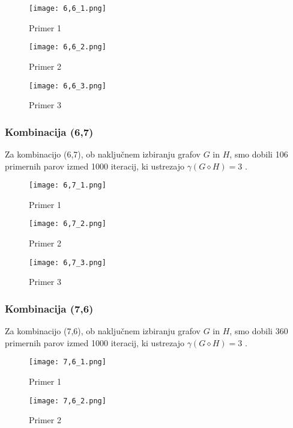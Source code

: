 \documentclass[a4paper,12pt]{article}
\theoremstyle{definition}
\begin{document}
\begin{figure}[H]
\centering
\texttt{[image: 6,6\_1.png]}
\caption{Primer 1}
\end{figure}

\begin{figure}[H]
\centering
\texttt{[image: 6,6\_2.png]}
\caption{Primer 2}
\end{figure}

\begin{figure}[H]
\centering
\texttt{[image: 6,6\_3.png]}
\caption{Primer 3}
\end{figure}

\subsubsection{Kombinacija (6,7)}
\noindent Za kombinacijo (6,7), ob naključnem izbiranju grafov $G$ in $H$, smo dobili 106 primernih parov izmed 1000 iteracij, ki ustrezajo $\gamma(G \diamond H) = 3$ .

\begin{figure}[H]
\centering
\texttt{[image: 6,7\_1.png]}
\caption{Primer 1}
\end{figure}

\begin{figure}[H]
\centering
\texttt{[image: 6,7\_2.png]}
\caption{Primer 2}
\end{figure}

\begin{figure}[H]
\centering
\texttt{[image: 6,7\_3.png]}
\caption{Primer 3}
\end{figure}

\newpage
\subsubsection{Kombinacija (7,6)}
\noindent Za kombinacijo (7,6), ob naključnem izbiranju grafov $G$ in $H$, smo dobili 360 primernih parov izmed 1000 iteracij, ki ustrezajo $\gamma(G \diamond H) = 3$ .

\begin{figure}[H]
\centering
\texttt{[image: 7,6\_1.png]}
\caption{Primer 1}
\end{figure}

\begin{figure}[H]
\centering
\texttt{[image: 7,6\_2.png]}
\caption{Primer 2}
\end{figure}
\end{document}
